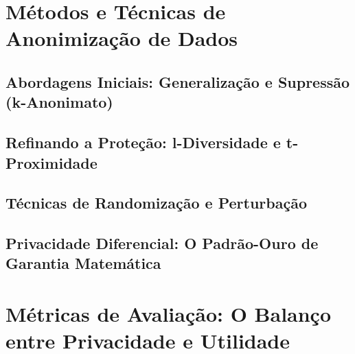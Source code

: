 \section{Métodos e Técnicas de Anonimização de Dados}
\label{sec:fund-metodos-anon}

\subsection{Abordagens Iniciais: Generalização e Supressão (k-Anonimato)}
\label{subsec:fund-k-anonimato}

\subsection{Refinando a Proteção: l-Diversidade e t-Proximidade}
\label{subsec:fund-l-diversidade}

\subsection{Técnicas de Randomização e Perturbação}
\label{subsec:fund-randomizacao}

\subsection{Privacidade Diferencial: O Padrão-Ouro de Garantia Matemática}
\label{subsec:fund-privacidade-diferencial}

\section{Métricas de Avaliação: O Balanço entre Privacidade e Utilidade}
\label{sec:fund-metricas}

